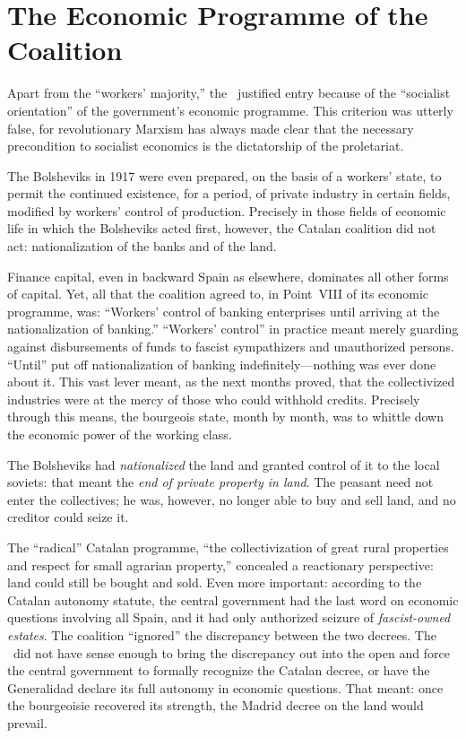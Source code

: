 \section*{The Economic Programme of the Coalition}

Apart from the ``workers’ majority,'' the \POUM\ justified entry because of the ``socialist orientation'' of the government’s economic programme. This criterion was utterly false, for revolutionary Marxism has always made clear that the necessary precondition to socialist economics is the dictatorship of the proletariat.

The Bolsheviks in 1917 were even prepared, on the basis of a workers’ state, to permit the continued existence, for a period, of private industry in certain fields, modified by workers’ control of production. Precisely in those fields of economic life in which the Bolsheviks acted first, however, the Catalan coalition did not act: nationalization of the banks and of the land.

Finance capital, even in backward Spain as elsewhere, dominates all other forms of capital. Yet, all that the coalition agreed to, in Point~VIII of its economic programme, was: ``Workers' control of banking enterprises until arriving at the nationalization of banking.'' ``Workers' control'' in practice meant merely guarding against disbursements of funds to fascist sympathizers and unauthorized persons. ``Until'' put off nationalization of banking indefinitely---nothing was ever done about it. This vast lever meant, as the next months proved, that the collectivized industries were at the mercy of those who could withhold credits. Precisely through this means, the bourgeois state, month by month, was to whittle down the economic power of the working class.

The Bolsheviks had \emph{nationalized} the land and granted control of it to the local soviets: that meant the \emph{end of private property in land}. The peasant need not enter the collectives; he was, however, no longer able to buy and sell land, and no creditor could seize it.

The ``radical'' Catalan programme, ``the collectivization of great rural properties and respect for small agrarian property,'' concealed a reactionary perspective: land could still be bought and sold. Even more important: according to the Catalan autonomy statute, the central government had the last word on economic questions involving all Spain, and it had only authorized seizure of \emph{fascist-owned estates}. The coalition ``ignored'' the discrepancy between the two decrees. The \POUM\ did not have sense enough to bring the discrepancy out into the open and force the central government to formally recognize the Catalan decree, or have the Generalidad declare its full autonomy in economic questions. That meant: once the bourgeoisie recovered its strength, the Madrid decree on the land would prevail.

